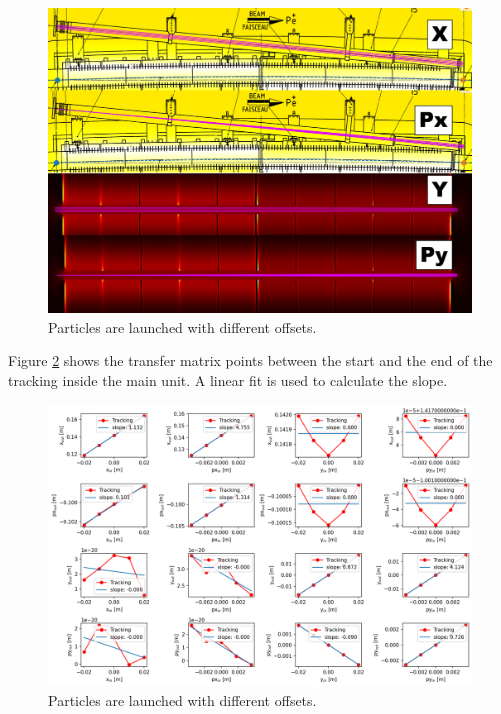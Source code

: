 \begin{figure}[H]
\centering
\includegraphics[width=1.0\textwidth]{02_Simulation/images/injection_transfer_matrix_3.png}
\caption{Particles are launched with different offsets.}
\label{fig:transfer_matrix_3}
\end{figure}

Figure \ref{fig:transfer_matrix_4} shows the transfer matrix points between the start and the end of the tracking inside the main unit. A linear fit is used to calculate the slope.

\begin{figure}[H]
\centering
\includegraphics[width=1.0\textwidth]{02_Simulation/images/injection_transfer_matrix_4.png}
\caption{Particles are launched with different offsets.}
\label{fig:transfer_matrix_4}
\end{figure}



